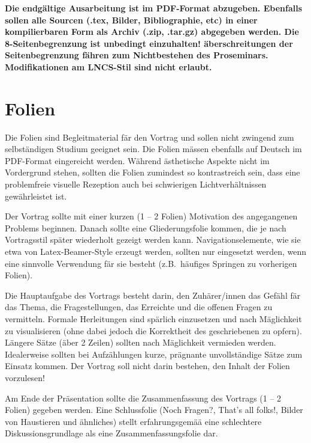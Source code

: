 \documentclass[fleqn,envcountsame,runningheads,10pt,a4paper]{llncs}
\begin{document}
\textbf{Die endgältige Ausarbeitung ist im PDF-Format abzugeben. Ebenfalls sollen alle Sourcen (.tex, Bilder, Bibliographie, etc) in einer kompilierbaren Form als Archiv (.zip, .tar.gz) abgegeben werden. Die 8-Sei\-ten\-be\-gren\-zung ist unbedingt einzuhalten! äberschreitungen der Seitenbegrenzung fähren zum Nichtbestehen des Proseminars. Modifikationen am LNCS-Stil sind nicht erlaubt.}

\section{Folien}
\label{sec:folien}

Die Folien sind Begleitmaterial fär den Vortrag und sollen nicht zwingend zum selbständigen Studium geeignet sein. Die Folien mässen ebenfalls auf Deutsch im PDF-Format eingereicht werden. Während ästhetische Aspekte nicht im Vordergrund stehen, sollten die Folien zumindest so kontrastreich sein, dass eine problemfreie visuelle Rezeption auch bei schwierigen Lichtverhältnissen gewährleistet ist.

Der Vortrag sollte mit einer kurzen (1 -- 2 Folien) Motivation des angegangenen Problems beginnen. Danach sollte eine Gliederungsfolie kommen, die je nach Vortragsstil später wiederholt gezeigt werden kann. Navigationselemente, wie sie etwa von Latex-Beamer-Style erzeugt werden, sollten nur eingesetzt werden, wenn eine sinnvolle Verwendung fär sie besteht (z.B.~häufiges Springen zu vorherigen Folien).

Die Hauptaufgabe des Vortrags besteht darin, den Zuhärer/innen das Gefähl fär das Thema, die Fragestellungen, das Erreichte und die offenen Fragen zu vermitteln. Formale Herleitungen sind spärlich einzusetzen und nach Mäglichkeit zu visualisieren (ohne dabei jedoch die Korrektheit des geschriebenen zu opfern). Längere Sätze (äber 2 Zeilen) sollten nach Mäglichkeit vermieden werden. Idealerweise sollten bei Aufzählungen kurze, prägnante unvollständige Sätze zum Einsatz kommen. Der Vortrag soll nicht darin bestehen, den Inhalt der Folien vorzulesen!

Am Ende der Präsentation sollte die Zusammenfassung des Vortrags (1 -- 2 Folien) gegeben werden. Eine Schlussfolie (\glqq Noch Fragen?\grqq, \glqq That's all folks!\grqq, Bilder von Haustieren und ähnliches) stellt erfahrungsgemää eine schlechtere Diskussionsgrundlage als eine Zusammenfassungsfolie dar.

\nocite{rfc:socks}
\nocite{rfc:ipsec}
\nocite{rfc:tls}
\nocite{tor}
\nocite{pctcp}
\nocite{tcp-over-dtls}


\end{document}
